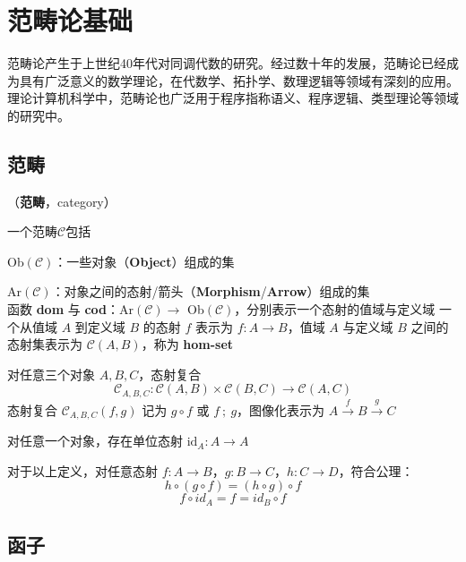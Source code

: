 \section{范畴论基础}

范畴论产生于上世纪40年代对同调代数的研究。经过数十年的发展，范畴论已经成为具有广泛意义的数学理论，在代数学、拓扑学、数理逻辑等领域有深刻的应用。理论计算机科学中，范畴论也广泛用于程序指称语义、程序逻辑、类型理论等领域的研究中。

\subsection{范畴}


\begin{defn}（\textbf{范畴}，category）

一个范畴$\mathcal{C}$包括

\begin{tightenum}
    \item Ob$(\mathcal{C})$：一些对象（\textbf{Object}）组成的集
    \item Ar$(\mathcal{C})$：对象之间的态射/箭头（\textbf{Morphism}/\textbf{Arrow}）组成的集\\
    函数 \textbf{dom} 与 \textbf{cod}：Ar$(\mathcal{C}) \rightarrow$ Ob$(\mathcal{C})$，分别表示一个态射的值域与定义域
    一个从值域 $A$ 到定义域 $B$ 的态射 $f$ 表示为 $f : A \rightarrow B$，值域 $A$ 与定义域 $B$ 之间的态射集表示为 $\mathcal{C}(A,B)$，称为 \textbf{hom-set}
    \item 对任意三个对象 $A, B, C$，态射复合
    \[ \mathcal{C}_{A,B,C} : \mathcal{C}(A,B) \times \mathcal{C}(B,C) \rightarrow \mathcal{C}(A,C)\]
    态射复合 $\mathcal{C}_{A,B,C}(f,g)$ 记为 $g \circ f$ 或 $f\ ;\ g$，图像化表示为 $A \overset{f}\longrightarrow B \overset{g}\longrightarrow C$
    \item 对任意一个对象，存在单位态射 $\text{id}_A : A \rightarrow A$
    \item 对于以上定义，对任意态射 $f : A \rightarrow B$，$g : B \rightarrow C$，$h : C \rightarrow D$，符合公理：
    \[ h \circ (g \circ f) = (h \circ g) \circ f \]
    \[ f \circ id_A = f = id_B \circ f \]
\end{tightenum}

\end{defn}


\subsection{函子}


